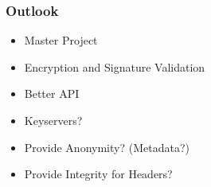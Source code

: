 \documentclass{beamer}
\begin{document}
\begin{frame}
	\frametitle{Outlook}
	\begin{itemize}
		\item Master Project
		\item Encryption and Signature Validation
		\item Better API
		\item Keyservers?
	\end{itemize}
	\begin{itemize}
		\item Provide Anonymity? (Metadata?)\footnotemark
		 \item Provide Integrity for Headers?
	\end{itemize}
\end{frame}


\end{document}
